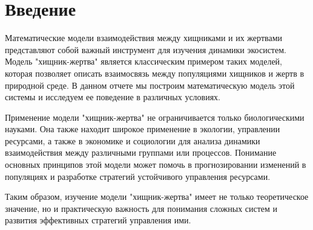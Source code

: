 \pagebreak

\section{Введение}
	Математические модели взаимодействия между хищниками и их жертвами представляют собой важный инструмент для изучения динамики экосистем. Модель "хищник-жертва" является классическим примером таких моделей, которая позволяет описать взаимосвязь между популяциями хищников и жертв в природной среде. В данном отчете мы построим математическую модель этой системы и исследуем ее поведение в различных условиях.

	Применение модели "хищник-жертва" не ограничивается только биологическими науками. Она также находит широкое применение в экологии, управлении ресурсами, а также в экономике и социологии для анализа динамики взаимодействия между различными группами или процессов. Понимание основных принципов этой модели может помочь в прогнозировании изменений в популяциях и разработке стратегий устойчивого управления ресурсами.

	Таким образом, изучение модели "хищник-жертва" имеет не только теоретическое значение, но и практическую важность для понимания сложных систем и развития эффективных стратегий управления ими.

\pagebreak